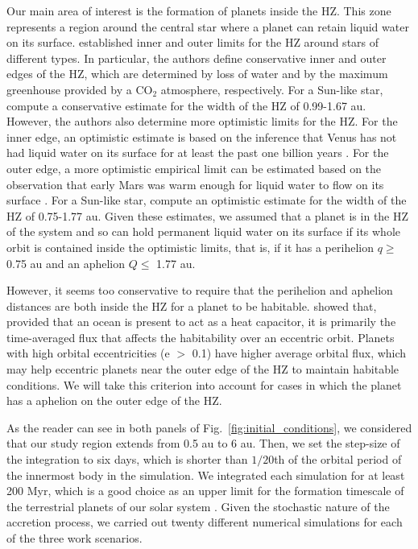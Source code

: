 \documentclass{aa}
\begin{document}
Our main area of interest is the formation of planets inside the HZ. This zone represents a
region around the central star where a planet can retain liquid water on its surface.
\citet{Kopparapu2013a, Kopparapu2013b}
established inner and outer limits for the HZ around stars of different types. In particular, the authors define conservative
inner and outer edges of the HZ, which are determined by loss of water and by the maximum greenhouse provided by a CO$_{2}$ atmosphere,
respectively. For a Sun-like star, \citet{Kopparapu2013a, Kopparapu2013b} compute a conservative estimate for the width of the HZ
of 0.99-1.67 au. However, the authors also determine more optimistic limits for the HZ. For the inner edge, an optimistic estimate is
based on the inference that Venus has not had liquid water on its surface for at least the past one billion years \citep{Solomon1991}. For the outer edge, a more optimistic empirical limit can be estimated based on the observation
that early Mars was warm enough for liquid water to flow on its surface \citep{Pollack1987, Bibring2006}. For a Sun-like star, \citet{Kopparapu2013a, Kopparapu2013b} compute an optimistic estimate for the width of the HZ of 0.75-1.77 au. Given these estimates, we assumed that a planet is in the HZ of the system
and so can hold permanent liquid water on its surface if its whole orbit is contained inside the optimistic limits, that is,
if it has a perihelion $q \geq$ 0.75 au and an aphelion $Q \leq$ 1.77 au.

However, it seems too conservative to require that the perihelion and aphelion distances are both inside the HZ for a planet to be
habitable. \citet{Williams2002} showed that, provided that an ocean is present to act as a heat capacitor, it is
primarily the time-averaged flux that affects the habitability over an eccentric orbit. Planets with high orbital eccentricities
(e $>$ 0.1) have higher average orbital flux, which may help eccentric planets near the outer edge of the HZ to maintain
habitable conditions. We will take this criterion into account for cases in which the planet has a aphelion on the outer edge of the HZ.

As the reader can see in both panels of Fig.~\ref{fig:initial_conditions}, we considered that our study region extends from 0.5 au to 6 au.
Then, we set the step-size of the integration to six days, which is shorter than $1/20$th of the orbital period of the innermost body
in the simulation. We integrated each simulation for at least 200 Myr, which is a good choice as an upper limit for the formation
timescale of the terrestrial planets of our solar system \citep{Touboul2007, Dauphas2011, Jacobson2014}. Given the stochastic nature of the accretion process, we carried out twenty different numerical simulations for each
of the three work scenarios.
\end{document}

